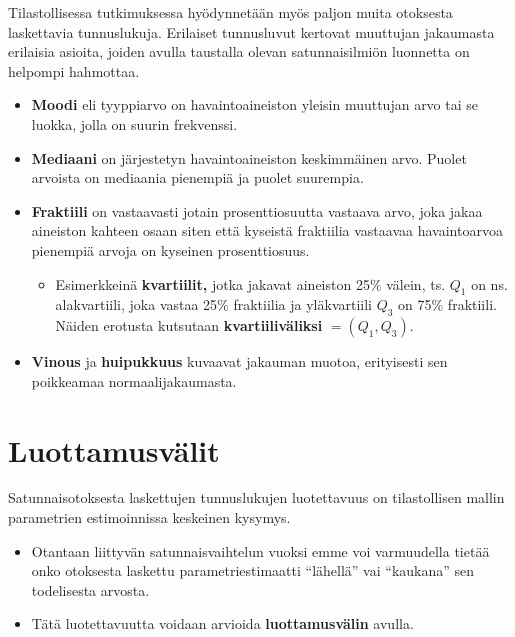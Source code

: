\documentclass[
]{report}
\providecommand{\tightlist}{%
  \setlength{\itemsep}{0pt}\setlength{\parskip}{0pt}}\usepackage{longtable,booktabs,array}
\begin{document}
Tilastollisessa tutkimuksessa hyödynnetään myös paljon muita otoksesta
laskettavia tunnuslukuja. Erilaiset tunnusluvut kertovat muuttujan
jakaumasta erilaisia asioita, joiden avulla taustalla olevan
satunnaisilmiön luonnetta on helpompi hahmottaa.

\begin{itemize}
\item
  \textbf{Moodi} eli tyyppiarvo on havaintoaineiston yleisin muuttujan
  arvo tai se luokka, jolla on suurin frekvenssi.
\item
  \textbf{Mediaani} on järjestetyn havaintoaineiston keskimmäinen arvo.
  Puolet arvoista on mediaania pienempiä ja puolet suurempia.
\item
  \textbf{Fraktiili} on vastaavasti jotain prosenttiosuutta vastaava
  arvo, joka jakaa aineiston kahteen osaan siten että kyseistä
  fraktiilia vastaavaa havaintoarvoa pienempiä arvoja on kyseinen
  prosenttiosuus.

  \begin{itemize}
  \tightlist
  \item
    Esimerkkeinä \textbf{kvartiilit,} jotka jakavat aineiston 25\%
    välein, ts. \(Q_1\) on ns. alakvartiili, joka vastaa 25\% fraktiilia
    ja yläkvartiili \(Q_3\) on 75\% fraktiili. Näiden erotusta kutsutaan
    \textbf{kvartiiliväliksi} \(=(Q_1,Q_3)\).
  \end{itemize}
\item
  \textbf{Vinous} ja \textbf{huipukkuus} kuvaavat jakauman muotoa,
  erityisesti sen poikkeamaa normaalijakaumasta.
\end{itemize}

\hypertarget{luottamusvuxe4lit}{%
\section{Luottamusvälit}\label{luottamusvuxe4lit}}

Satunnaisotoksesta laskettujen tunnuslukujen luotettavuus on
tilastollisen mallin parametrien estimoinnissa keskeinen kysymys.

\begin{itemize}
\item
  Otantaan liittyvän satunnaisvaihtelun vuoksi emme voi varmuudella
  tietää onko otoksesta laskettu parametriestimaatti ``lähellä'' vai
  ``kaukana'' sen todelisesta arvosta.
\item
  Tätä luotettavuutta voidaan arvioida \textbf{luottamusvälin} avulla.
\end{itemize}
\end{document}
